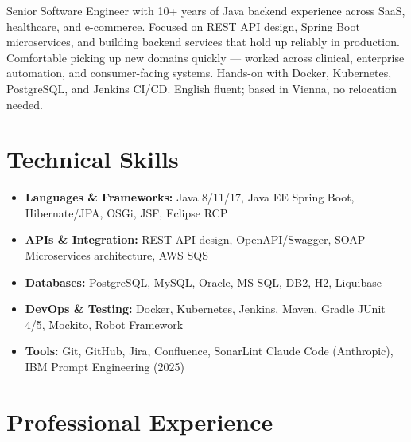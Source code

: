 \documentclass[10pt,a4paper,sans]{moderncv}
\begin{document}
\makecvtitle
\vspace{-10pt}

\small{Senior Software Engineer with 10+ years of Java backend experience across SaaS, healthcare, and e-commerce. Focused on REST API design, Spring Boot microservices, and building backend services that hold up reliably in production. Comfortable picking up new domains quickly — worked across clinical, enterprise automation, and consumer-facing systems. Hands-on with Docker, Kubernetes, PostgreSQL, and Jenkins CI/CD. English fluent; based in Vienna, no relocation needed.}

\vspace{2pt}

\section{Technical Skills}
\vspace{1pt}
\begin{itemize}
  \item \textbf{Languages \& Frameworks:} Java 8/11/17, Java EE \textbar{} Spring Boot, Hibernate/JPA, OSGi, JSF, Eclipse RCP
  \item \textbf{APIs \& Integration:} REST API design, OpenAPI/Swagger, SOAP \textbar{} Microservices architecture, AWS SQS
  \item \textbf{Databases:} PostgreSQL, MySQL, Oracle, MS SQL, DB2, H2, Liquibase
  \item \textbf{DevOps \& Testing:} Docker, Kubernetes, Jenkins, Maven, Gradle \textbar{} JUnit 4/5, Mockito, Robot Framework
  \item \textbf{Tools:} Git, GitHub, Jira, Confluence, SonarLint \textbar{} Claude Code (Anthropic), IBM Prompt Engineering (2025)
\end{itemize}

\section{Professional Experience}
\vspace{1pt}
\end{document}

